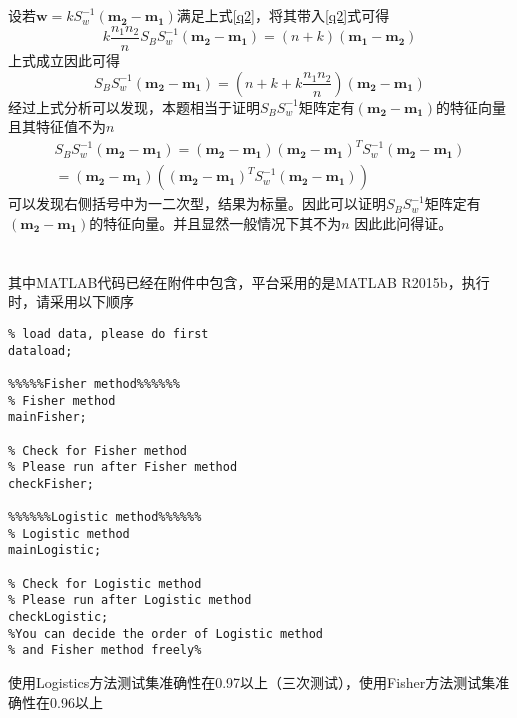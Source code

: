 \documentclass[UTF8,a4paper]{ctexart}
\begin{document}
\subsection{}
设若$\mathbf{w}=kS_w^{-1}(\mathbf{m_2-m_1})$满足上式\ref{q2}，将其带入\ref{q2}式可得
\begin{equation}
k\frac{n_1n_2}{n}S_BS_w^{-1}(\mathbf{m_2-m_1})=(n+k)(\mathbf{m_1-m_2})
\end{equation}
上式成立因此可得
\begin{equation}
S_BS_w^{-1}(\mathbf{m_2-m_1})=(n+k+k\frac{n_1n_2}{n})(\mathbf{m_2-m_1})
\end{equation}
经过上式分析可以发现，本题相当于证明$S_BS_w^{-1}$矩阵定有$(\mathbf{m_2-m_1})$的特征向量且其特征值不为$n$
\begin{equation}\begin{aligned}
S_BS_w^{-1}(\mathbf{m_2-m_1})=(\mathbf{m_2-m_1})(\mathbf{m_2-m_1})^TS_w^{-1}(\mathbf{m_2-m_1})\\
=(\mathbf{m_2-m_1})((\mathbf{m_2-m_1})^TS_w^{-1}(\mathbf{m_2-m_1}))
\end{aligned}
\end{equation}
可以发现右侧括号中为一二次型，结果为标量。因此可以证明$S_BS_w^{-1}$矩阵定有$(\mathbf{m_2-m_1})$的特征向量。并且显然一般情况下其不为$n$
因此此问得证。
\section{}
其中MATLAB代码已经在附件中包含，平台采用的是MATLAB R2015b，执行时，请采用以下顺序
\lstset{language=Matlab}
\begin{lstlisting}
% load data, please do first
dataload; 

%%%%%Fisher method%%%%%%
% Fisher method
mainFisher; 

% Check for Fisher method
% Please run after Fisher method
checkFisher; 

%%%%%%Logistic method%%%%%%
% Logistic method
mainLogistic; 

% Check for Logistic method
% Please run after Logistic method
checkLogistic; 
%You can decide the order of Logistic method 
% and Fisher method freely%

\end{lstlisting}
使用Logistics方法测试集准确性在0.97以上（三次测试），使用Fisher方法测试集准确性在0.96以上
\end{document}
